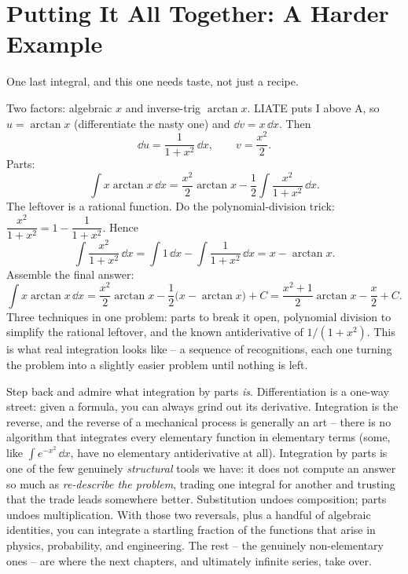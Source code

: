 \section{Putting It All Together: A Harder Example}
\label{ch23:harder}

One last integral, and this one needs taste, not just a recipe.

\begin{example}
\label{ch23:ex-xarctan}
Two factors: algebraic $x$ and inverse-trig $\arctan x$. LIATE puts I above A, so
$u = \arctan x$ (differentiate the nasty one) and $\dd v = x\,\dd x$. Then
\[
\dd u = \frac{1}{1+x^2}\,\dd x, \qquad v = \frac{x^2}{2}.
\]
Parts:
\[
\int x\arctan x\,\dd x
= \frac{x^2}{2}\arctan x - \frac12\int \frac{x^2}{1+x^2}\,\dd x.
\]
The leftover is a rational function. Do the polynomial-division trick:
$\dfrac{x^2}{1+x^2} = 1 - \dfrac{1}{1+x^2}$. Hence
\[
\int \frac{x^2}{1+x^2}\,\dd x = \int 1\,\dd x - \int\frac{1}{1+x^2}\,\dd x
= x - \arctan x.
\]
Assemble the final answer:
\[
\int x\arctan x\,\dd x
= \frac{x^2}{2}\arctan x - \frac12\big(x - \arctan x\big) + C
= \frac{x^2+1}{2}\arctan x - \frac{x}{2} + C.
\]
Three techniques in one problem: parts to break it open, polynomial division to
simplify the rational leftover, and the known antiderivative of $1/(1+x^2)$. This
is what real integration looks like -- a sequence of recognitions, each one
turning the problem into a slightly easier problem until nothing is left.
\end{example}

\begin{aestheticbox}
Step back and admire what integration by parts \emph{is}. Differentiation is a
one-way street: given a formula, you can always grind out its derivative.
Integration is the reverse, and the reverse of a mechanical process is generally
an art -- there is no algorithm that integrates every elementary function in
elementary terms (some, like $\int e^{-x^2}\,\dd x$, have no elementary
antiderivative at all). Integration by parts is one of the few genuinely
\emph{structural} tools we have: it does not compute an answer so much as
\emph{re-describe the problem}, trading one integral for another and trusting that
the trade leads somewhere better. Substitution undoes composition; parts undoes
multiplication. With those two reversals, plus a handful of algebraic identities,
you can integrate a startling fraction of the functions that arise in physics,
probability, and engineering. The rest -- the genuinely non-elementary ones --
are where the next chapters, and ultimately infinite series, take over.
\end{aestheticbox}

